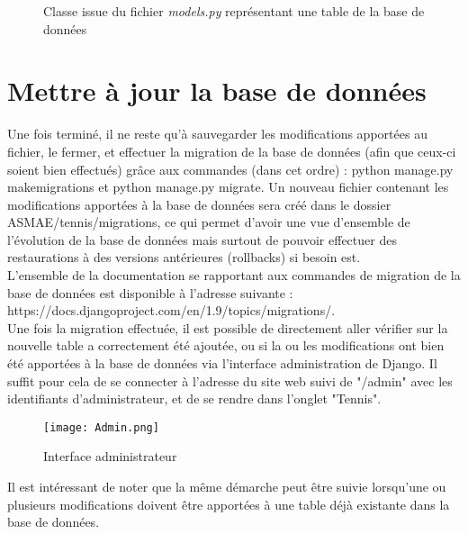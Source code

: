 \begin{figure}[!ht]
\centering
\begin{framed}

\end{framed}
\caption{Classe issue du fichier \textit{models.py} représentant une table de la base de données}
\label{fig:Classe issue du fichier models.py représentant une table de la base de données}
\end{figure}
\FloatBarrier

\section{Mettre à jour la base de données}

Une fois terminé, il ne reste qu'à sauvegarder les modifications apportées au fichier, le fermer, et effectuer la migration de la base de données (afin que ceux-ci soient bien effectués) grâce aux commandes (dans cet ordre) : python manage.py makemigrations et python manage.py migrate. Un nouveau fichier contenant les modifications apportées à la base de données sera créé dans le dossier ASMAE/tennis/migrations, ce qui permet d'avoir une vue d'ensemble de l'évolution de la base de données mais surtout de pouvoir effectuer des restaurations à des versions antérieures (rollbacks) si besoin est.\\


L'ensemble de la documentation se rapportant aux commandes de migration de la base de données est disponible à l'adresse suivante : https://docs.djangoproject.com/en/1.9/topics/migrations/.\\

Une fois la migration effectuée, il est possible de directement aller vérifier sur la nouvelle table a correctement été ajoutée, ou si la ou les modifications ont bien été apportées à la base de données via l'interface administration de Django. Il suffit pour cela de se connecter à l'adresse du site web suivi de "/admin" avec les identifiants d'administrateur, et de se rendre dans l'onglet "Tennis".\\

\begin{figure}[H]
\centering
\texttt{[image: Admin.png]}
\caption{Interface administrateur}
\end{figure}

Il est intéressant de noter que la même démarche peut être suivie lorsqu'une ou plusieurs modifications doivent être apportées à une table déjà existante dans la base de données.\\

